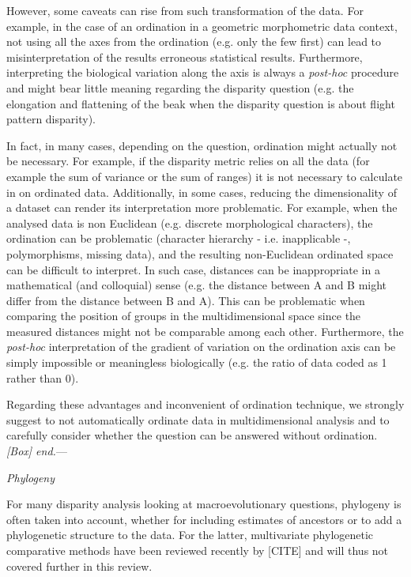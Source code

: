 \documentclass[12pt,letterpaper]{article}
\renewcommand{\subsection}[1]{%
\bigskip
\begin{center}
\begin{large}
\normalfont\itshape #1
\end{large}
\end{center}}
\renewcommand{\subsubsection}[1]{%
\vspace{2ex}
\noindent
\textit{#1.}---}
\begin{document}
However, some caveats can rise from such transformation of the data.
For example, in the case of an ordination in a geometric morphometric data context, not using all the axes from the ordination (e.g. only the few first) can lead to misinterpretation of the results erroneous statistical results.
Furthermore, interpreting the biological variation along the axis is always a \textit{post-hoc} procedure and might bear little meaning regarding the disparity question (e.g. the elongation and flattening of the beak when the disparity question is about flight pattern disparity).

In fact, in many cases, depending on the question, ordination might actually not be necessary.
For example, if the disparity metric relies on all the data (for example the sum of variance or the sum of ranges) it is not necessary to calculate in on ordinated data.
Additionally, in some cases, reducing the dimensionality of a dataset can render its interpretation more problematic.
For example, when the analysed data is non Euclidean (e.g. discrete morphological characters), the ordination can be problematic (character hierarchy - i.e. inapplicable -, polymorphisms, missing data), and the resulting non-Euclidean ordinated space can be difficult to interpret.
In such case, distances can be inappropriate in a mathematical (and colloquial) sense (e.g. the distance between A and B might differ from the distance between B and A).
This can be problematic when comparing the position of groups in the multidimensional space since the measured distances might not be comparable among each other.
Furthermore, the \textit{post-hoc} interpretation of the gradient of variation on the ordination axis can be simply impossible or meaningless biologically (e.g. the ratio of data coded as 1 rather than 0).

Regarding these advantages and inconvenient of ordination technique, we strongly suggest to not automatically ordinate data in multidimensional analysis and to carefully consider whether the question can be answered without ordination.
\subsubsection{[Box] end}

\subsection{Phylogeny}
For many disparity analysis looking at macroevolutionary questions, phylogeny is often taken into account, whether for including estimates of ancestors or to add a phylogenetic structure to the data.
For the latter, multivariate phylogenetic comparative methods have been reviewed recently by [CITE] %
and will thus not covered further in this review.
\end{document}
